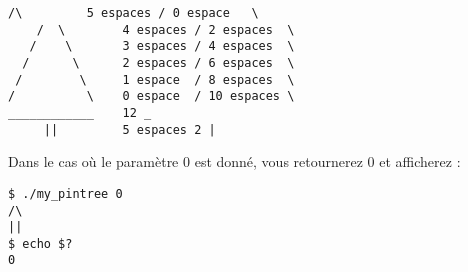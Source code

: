 \hspace*{-\parindent} %
\begin{minipage}{15.85cm} %
\lstset{language=sh}
\begin{lstlisting}[frame=single,title={Cas général 5}]
     /\         5 espaces / 0 espace   \
    /  \        4 espaces / 2 espaces  \
   /    \       3 espaces / 4 espaces  \
  /      \      2 espaces / 6 espaces  \
 /        \     1 espace  / 8 espaces  \
/          \    0 espace  / 10 espaces \
____________    12 _
     ||         5 espaces 2 |
\end{lstlisting}
\end{minipage} %

\bigskip

\noindent Dans le cas où le paramètre 0 est donné, vous retournerez 0 et afficherez :

\bigskip

\lstset{language=sh}
\begin{lstlisting}[frame=single,title={Cas 0}]
$ ./my_pintree 0
/\
||
$ echo $?
0
\end{lstlisting}
